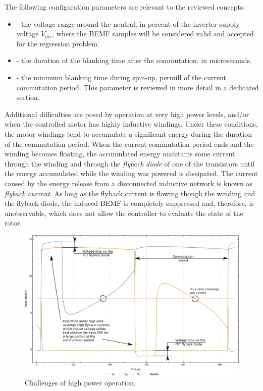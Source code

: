 \documentclass{zubaxdoc}
\begin{document}
The following configuration parameters are relevant to the reviewed concepts:

\begin{itemize}
\item {} - the voltage range around the neutral,
in percent of the inverter supply voltage $V_\text{inv}$, where the BEMF samples
will be considered valid and accepted for the regression problem.
\item {} - the duration of the blanking time after the commutation, in microseconds.
\item {} - the minimum blanking time during spin-up,
permill of the current commutation period.
This parameter is reviewed in more detail in a dedicated section.
\end{itemize}

Additional difficulties are posed by operation at very high power levels,
and/or when the controlled motor has highly inductive windings.
Under these conditions, the motor windings tend to accumulate a significant energy during the duration
of the commutation period.
When the current commutation period ends and the winding becomes floating,
the accumulated energy maintains some current through the winding and through the \emph{flyback diode}
of one of the transistors until the energy accumulated while the winding was powered is dissipated.
The current caused by the energy release from a disconnected inductive network is known as
\emph{flyback current}.
As long as the flyback current is flowing though the winding and the flyback diode,
the induced BEMF is completely suppressed and, therefore,
is unobservable, which does not allow the controller to evaluate the state of the rotor.

\begin{figure}[hbtp]
    \centering
	\includegraphics[width=\textwidth]{phase_voltages_at_high_load}
	\caption{Challenges of high power operation.
	\label{phase_voltages_at_high_load}}
\end{figure}
\end{document}
